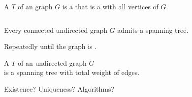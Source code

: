 
\begin{frame}{}
  \begin{definition}
    A  $T$ of an  graph $G$
    is a  that is a  with all vertices of $G$.
  \end{definition}

  \pause
  \vspace{0.50cm}
  \begin{columns}
  \end{columns}
\end{frame}

\begin{frame}{}
  \begin{definition}[Subgraph (子图)]
  \end{definition}

  \pause
  \vspace{0.50cm}
  \begin{definition}
  \end{definition}
\end{frame}

\begin{frame}{}
  \begin{theorem}
    Every connected undirected graph $G$ admits a spanning tree.
  \end{theorem}

  \pause
  \vspace{0.50cm}
  \begin{center}
    Repeatedly  until the graph is .
  \end{center}
\end{frame}

\begin{frame}{}
  \begin{definition}
    A  $T$ of an  undirected graph $G$ \\
    is a spanning tree with  total weight of edges.
  \end{definition}

  \pause
  \vspace{0.50cm}

  \pause
  \begin{center}
    Existence? \qquad Uniqueness? \qquad Algorithms?
  \end{center}
\end{frame}

